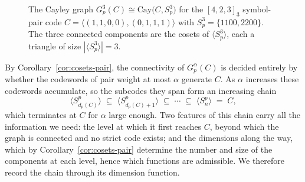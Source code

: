 \documentclass[11pt,draftclsnofoot,journal,onecolumn]{IEEEtran}
\begin{document}
    \begin{figure}[t]
    \centering
    \caption{The Cayley graph $G^{3}_p(C)\cong\mathrm{Cay}\bigl(C,S^{3}_p\bigr)$ for the $[4,2, 3]_3$ symbol-pair code $C=\langle(1,1,0,0),(0,1,1,1)\rangle$ with $S^{3}_p=\{1100,2200\}$. The three connected components are the cosets of $\langle S^{3}_p\rangle$, each a triangle of size $|\langle S^{3}_p\rangle|=3$.}
    \label{fig:cayley-ternary}
    \end{figure}


    By Corollary~\ref{cor:cosets-pair}, the connectivity of $G_p^{\alpha}(C)$ is decided entirely by whether the codewords of pair weight at most $\alpha$ generate $C$. As $\alpha$ increases these codewords accumulate, so the subcodes they span form an increasing chain
    \[
    \langle S^p_{d_p(C)}\rangle \;\subseteq\; \langle S^p_{d_p(C)+1}\rangle
    \;\subseteq\;\cdots\;\subseteq\; \langle S^p_{n}\rangle \;=\; C ,
    \]
    which terminates at $C$ for $\alpha$ large enough. Two features of this chain carry all the information we need: the level at which it first reaches $C$, beyond which the graph is connected and no strict code exists; and the dimensions along the way, which by Corollary~\ref{cor:cosets-pair} determine the number and size of the components at each level, hence which functions are admissible. We therefore record the chain through its dimension function.
    
\end{document}
